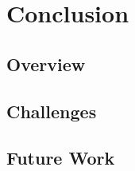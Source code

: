 \section{Conclusion}																	
\label{sec:Conclusion}

\subsection{Overview} 

\subsection{Challenges}

\subsection{Future Work}

